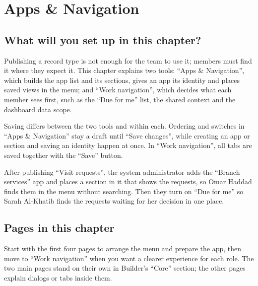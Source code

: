 \chapter{Apps \& Navigation}
\label{ch:builder-navigation}

\section{What will you set up in this chapter?}
\label{sec:builder-navigation-intro}

Publishing a record type is not enough for the team to use it; members must find it where they expect it. This chapter explains two tools: “Apps \& Navigation”, which builds the app list and its sections, gives an app its identity and places saved views in the menu; and “Work navigation”, which decides what each member sees first, such as the “Due for me” list, the shared context and the dashboard data scope.

Saving differs between the two tools and within each. Ordering and switches in “Apps \& Navigation” stay a draft until “Save changes”, while creating an app or section and saving an identity happen at once. In “Work navigation”, all tabs are saved together with the “Save” button.

\begin{rcnote}
After publishing “Visit requests”, the system administrator adds the “Branch services” app and places a section in it that shows the requests, so Omar Haddad finds them in the menu without searching. Then they turn on “Due for me” so Sarah Al-Khatib finds the requests waiting for her decision in one place.
\end{rcnote}

\section{Pages in this chapter}
\label{sec:builder-navigation-pages}

Start with the first four pages to arrange the menu and prepare the app, then move to “Work navigation” when you want a clearer experience for each role. The two main pages stand on their own in Builder's “Core” section; the other pages explain dialogs or tabs inside them.


